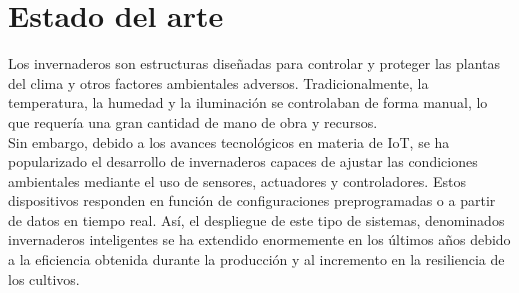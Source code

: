 



\section{Estado del arte}
\label{sec:Estado del arte}

Los invernaderos son estructuras diseñadas para controlar y proteger las plantas del clima y otros factores ambientales adversos. Tradicionalmente, la temperatura, la humedad y la iluminación se controlaban de forma manual, lo que requería una gran cantidad de mano de obra y recursos. \\
Sin embargo, debido a los avances tecnológicos en materia de IoT, se ha popularizado el desarrollo de invernaderos capaces de ajustar las condiciones ambientales mediante el uso de sensores, actuadores y controladores. Estos dispositivos responden en función de configuraciones preprogramadas o a partir de datos en tiempo real.  
Así, el despliegue de este tipo de sistemas, denominados invernaderos inteligentes se ha extendido enormemente en los últimos años debido a la eficiencia obtenida durante la producción y al incremento en la resiliencia de los cultivos\citep{agrofacto}.



